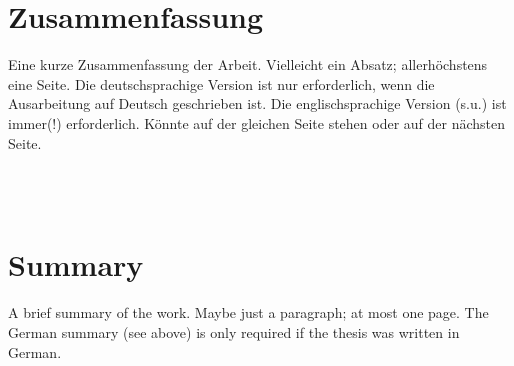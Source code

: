 

\section*{Zusammenfassung}

Eine kurze Zusammenfassung der Arbeit.
Vielleicht ein Absatz; allerhöchstens eine Seite.
Die deutschsprachige Version ist nur erforderlich, wenn die Ausarbeitung auf Deutsch geschrieben ist.
Die englischsprachige Version (s.u.) ist immer(!) erforderlich.
Könnte auf der gleichen Seite stehen oder auf der nächsten Seite.



~\\
~\\
\section*{Summary}

A brief summary of the work.
Maybe just a paragraph; at most one page.
The German summary (see above) is only required if the thesis was written in German.
